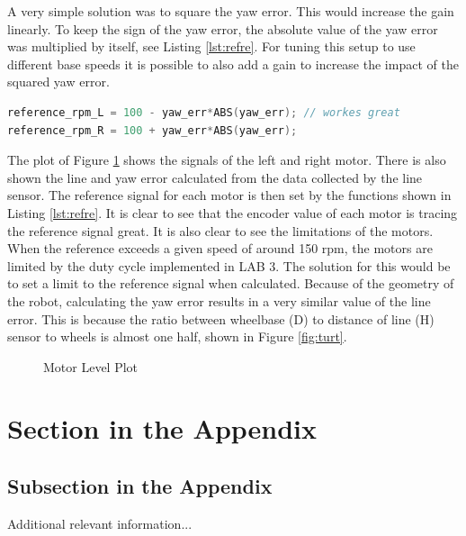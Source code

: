 \documentclass[english]{article}
\begin{document}
 A very simple solution was to square the yaw error.
  This would increase the gain linearly. To keep the
   sign of the yaw error, the absolute value of the yaw 
   error was multiplied by itself, see Listing \ref{lst:refre}. For tuning
    this setup to use different base speeds it is possible to
     also add a gain to increase the impact of the squared yaw error.   
\begin{lstlisting}[language=C, caption={Calculating the reference signals for the motors}, label={lst:refre} ]
reference_rpm_L = 100 - yaw_err*ABS(yaw_err); // workes great 
reference_rpm_R = 100 + yaw_err*ABS(yaw_err);
\end{lstlisting}
\newpage
The plot of Figure \ref{fig:datal4} shows the signals of the left and right motor. There is also 
shown the line and yaw error calculated from the data collected by the line sensor.
The reference signal for each motor is then set by the functions shown in Listing \ref{lst:refre}.
It is clear to see that the encoder value of each motor is tracing the reference 
signal great. It is also clear to see the limitations of the motors. When the
reference exceeds a given speed of around 150 rpm, the motors are limited by the 
duty cycle implemented in LAB 3. The solution for this would be to set a limit to
the reference signal when calculated. Because of the geometry of the robot,
calculating the yaw error results in a very similar value of the line error.
This is because the ratio between wheelbase (D) to distance of line (H) sensor 
to wheels is almost one half, shown in Figure \ref{fig:turt}. 
\begin{figure}[tbh]
    \centering
    
    \caption{Motor Level Plot}
    \label{fig:datal4}
\end{figure}

\clearpage
\appendix

\section{Section in the Appendix}
\label{sec:app1}

\subsection{Subsection in the Appendix}
\label{subsec:app2}

Additional relevant information...
\end{document}
